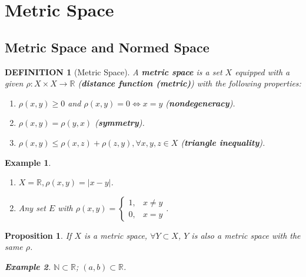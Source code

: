 \documentclass[12pt]{article}
\theoremstyle{blueplain}
\newtheorem{proposition}[theorem]{Proposition}
\theoremstyle{bluedef}
\newtheorem{definition}{DEFINITION}[section]
\theoremstyle{blueremark}
\newtheorem{example}{Example}[section]
\newcommand{\R}{\mathbb{R}}
\newcommand{\N}{\mathbb{N}}
\numberwithin{equation}{section}
\begin{document}
      \clearpage


      \section{Metric Space}

      \clearpage

      \subsection{Metric Space and Normed Space}

      \begin{definition}[Metric Space]
        A \textbf{metric space} is a set $X$ equipped with a given $\rho: X \times X \to \R$ (\textbf{distance function (metric)}) with the following properties:
        \begin{enumerate}
          \item $\rho(x, y) \geq 0$ and $\rho(x, y) = 0 \iff x = y$ (\textbf{nondegeneracy}).
          \item $\rho(x, y) = \rho(y, x)$ (\textbf{symmetry}).
          \item $\rho(x, y) \leq \rho(x, z) + \rho(z, y), \forall x, y, z \in X$ (\textbf{triangle inequality}).
        \end{enumerate}
      \end{definition}

      \begin{example}
        \begin{enumerate}
          \item $X = \R, \rho(x, y) = |x - y|$.
          \item Any set $E$ with $\rho(x, y) = \begin{cases} 1, & x \neq y \\ 0, & x = y \end{cases}$.
        \end{enumerate}
      \end{example}

      \begin{proposition}
        If $X$ is a metric space, $\forall Y \subset X$, $Y$ is also a metric space with the same $\rho$.
        \begin{example}
          $\N \subset \R$; $(a, b) \subset \R$.
        \end{example}
      \end{proposition}
\end{document}
